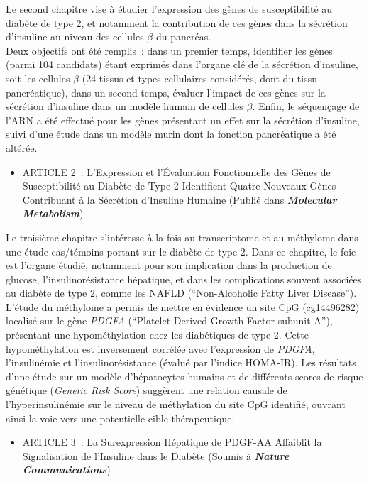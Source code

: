 \documentclass[11pt,a4paper,notrimn]{krantz}
\providecommand{\tightlist}{%
  \setlength{\itemsep}{0pt}\setlength{\parskip}{0pt}}
\theoremstyle{definition}
\theoremstyle{definition}
\theoremstyle{remark}
\begin{document}
Le second chapitre vise à étudier l'expression des gènes de
susceptibilité au diabète de type 2, et notamment la contribution de ces
gènes dans la sécrétion d'insuline au niveau des cellules \(\beta\) du
pancréas.\\
Deux objectifs ont été remplis~: dans un premier temps, identifier les
gènes (parmi 104 candidats) étant exprimés dans l'organe clé de la
sécrétion d'insuline, soit les cellules \(\beta\) (24 tissus et types
cellulaires considérés, dont du tissu pancréatique), dans un second
temps, évaluer l'impact de ces gènes sur la sécrétion d'insuline dans un
modèle humain de cellules \(\beta\). Enfin, le séquençage de l'ARN a été
effectué pour les gènes présentant un effet sur la sécrétion d'insuline,
suivi d'une étude dans un modèle murin dont la fonction pancréatique a
été altérée.

\begin{itemize}
\tightlist
\item
  ARTICLE 2~: L'Expression et l'Évaluation Fonctionnelle des Gènes de
  Susceptibilité au Diabète de Type 2 Identifient Quatre Nouveaux Gènes
  Contribuant à la Sécrétion d'Insuline Humaine (Publié dans
  \textbf{\emph{Molecular Metabolism}})
\end{itemize}

Le troisième chapitre s'intéresse à la fois au transcriptome et au
méthylome dans une étude cas/témoins portant sur le diabète de type 2.
Dans ce chapitre, le foie est l'organe étudié, notamment pour son
implication dans la production de glucose, l'insulinorésistance
hépatique, et dans les complications souvent associées au diabète de
type 2, comme les NAFLD (``Non-Alcoholic Fatty Liver Disease''). L'étude
du méthylome a permis de mettre en évidence un site CpG (cg14496282)
localisé sur le gène \emph{PDGFA} (``Platelet-Derived Growth Factor
subunit A''), présentant une hypométhylation chez les diabétiques de
type 2. Cette hypométhylation est inversement corrélée avec l'expression
de \emph{PDGFA}, l'insulinémie et l'insulinorésistance (évalué par
l'indice HOMA-IR). Les résultats d'une étude sur un modèle d'hépatocytes
humains et de différents scores de risque génétique (\emph{Genetic Risk
Score}) suggèrent une relation causale de l'hyperinsulinémie sur le
niveau de méthylation du site CpG identifié, ouvrant ainsi la voie vers
une potentielle cible thérapeutique.

\begin{itemize}
\tightlist
\item
  ARTICLE 3~: La Surexpression Hépatique de PDGF-AA Affaiblit la
  Signalisation de l'Insuline dans le Diabète (Soumis à
  \textbf{\emph{Nature Communications}})
\end{itemize}
\end{document}
